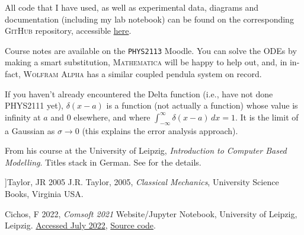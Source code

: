 \documentclass[aps,prl,reprint,10pt,amsmath,amssymb,superscriptaddress,a4paper, floatfix]{revtex4-2}
\begin{document}
All code that I have used, as well as experimental data, diagrams and documentation (including my lab notebook) can be found on the corresponding \textsc{GitHub} repository, accessible \href{https://github.com/Sam-js2/PHYS2113-Lab-Report}{here}.

\begin{thebibliography}{99}

 Course notes are available on the \texttt{PHYS2113} Moodle. You can solve the ODEs by making a smart substitution, \textsc{Mathematica} will be happy to help out, and, in in-fact, \textsc{Wolfram Alpha} has a similar coupled pendula system on record.

\vspace*{6pt}

 If you haven’t already encountered the Delta function (i.e., have not done \textsc{PHYS2111} yet), $\delta \left( x - a\right) $ is a function (not actually a function) whose value is infinity at $a$ and $0$ elsewhere, and where $ \int_{-\infty}^{\infty} \delta \left( x - a\right)\,dx  = 1$. It is the limit of a Gaussian as $\sigma \to 0$ (this explains the error analysis approach).

\vspace*{6pt}

 From his course at the University of Leipzig, {\it Introduction to Computer Based Modelling}. Titles stack in German. See \cite{GitHub} for the details.

\vspace*{6pt}

\bibitem]{Taylor, JR 2005} J.R. Taylor, 2005, {\it Classical Mechanics}, University Science Books, Virginia USA.

\vspace*{6pt}

 Cichos, F 2022, {\it Comsoft 2021} Website/Jupyter Notebook, University of Leipzig, Leipzig. \href{https://fcichos.github.io/CompSoft21/course-info/website.html}{Accessed July 2022}, \href{https://github.com/fcichos/CompSoft21}{Source code}.

\end{thebibliography}
\end{document}
